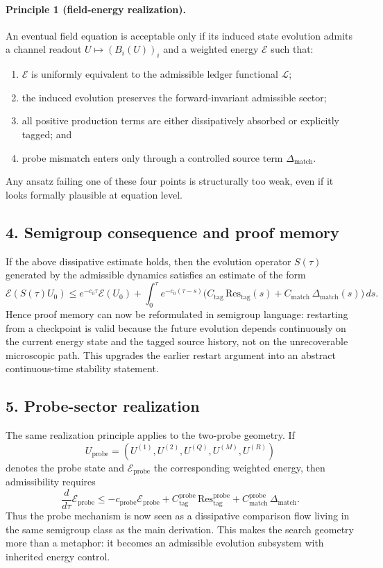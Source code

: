 \paragraph{Principle 1 (field-energy realization).}
An eventual field equation is acceptable only if its induced state evolution admits a
channel readout $U\mapsto (B_i(U))_i$ and a weighted energy $\mathcal E$ such that:
\begin{enumerate}[label=(\alph*)]
  \item $\mathcal E$ is uniformly equivalent to the admissible ledger functional $\mathcal L$;
  \item the induced evolution preserves the forward-invariant admissible sector;
  \item all positive production terms are either dissipatively absorbed or explicitly tagged; and
  \item probe mismatch enters only through a controlled source term $\Delta_{\mathrm{match}}$.
\end{enumerate}
Any ansatz failing one of these four points is structurally too weak, even if it
looks formally plausible at equation level.

\subsection*{4. Semigroup consequence and proof memory}
If the above dissipative estimate holds, then the evolution operator $S(\tau)$
generated by the admissible dynamics satisfies an estimate of the form
\[
\mathcal E(S(\tau)U_0)
\le e^{-c_0\tau}\mathcal E(U_0)
+\int_0^\tau e^{-c_0(\tau-s)}
\bigl(C_{\mathrm{tag}}\,\mathrm{Res}_{\mathrm{tag}}(s)
+ C_{\mathrm{match}}\,\Delta_{\mathrm{match}}(s)\bigr)\,ds.
\]
Hence proof memory can now be reformulated in semigroup language: restarting from a
checkpoint is valid because the future evolution depends continuously on the current
energy state and the tagged source history, not on the unrecoverable microscopic path.
This upgrades the earlier restart argument into an abstract continuous-time stability
statement.

\subsection*{5. Probe-sector realization}
The same realization principle applies to the two-probe geometry. If
\[
U_{\mathrm{probe}}=(U^{(1)},U^{(2)},U^{(Q)},U^{(M)},U^{(R)})
\]
denotes the probe state and $\mathcal E_{\mathrm{probe}}$ the corresponding weighted
energy, then admissibility requires
\[
\frac{d}{d\tau}\mathcal E_{\mathrm{probe}}
\le -c_{\mathrm{probe}}\mathcal E_{\mathrm{probe}}
+ C^{\mathrm{probe}}_{\mathrm{tag}}\,\mathrm{Res}^{\mathrm{probe}}_{\mathrm{tag}}
+ C^{\mathrm{probe}}_{\mathrm{match}}\,\Delta_{\mathrm{match}}.
\]
Thus the probe mechanism is now seen as a dissipative comparison flow living in the
same semigroup class as the main derivation. This makes the search geometry more than
a metaphor: it becomes an admissible evolution subsystem with inherited energy
control.

